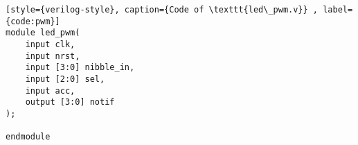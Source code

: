 \begin{lstlisting}[style={verilog-style}, caption={Code of \texttt{led\_pwm.v}} , label={code:pwm}]
module led_pwm(
	input clk,
	input nrst,
	input [3:0] nibble_in,
	input [2:0] sel,
	input acc,
	output [3:0] notif
);

endmodule
\end{lstlisting}